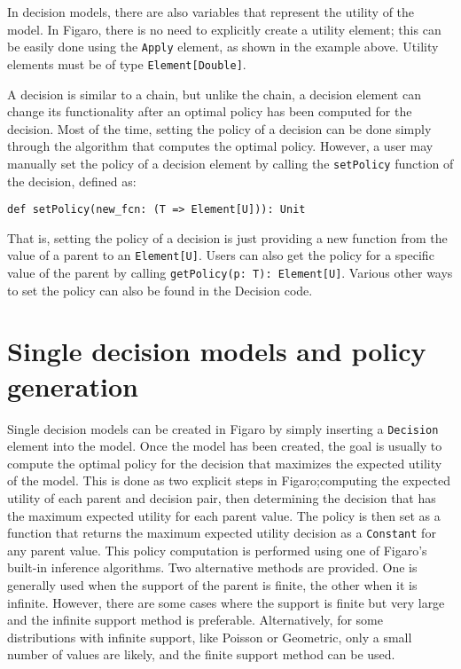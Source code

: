 In decision models, there are also variables that represent the utility of the model. In Figaro, there is no need to explicitly create a utility element; this can be easily done using the \texttt{Apply} element, as shown in the example above. Utility elements must be of type \texttt{Element[Double]}.

A decision is similar to a chain, but unlike the chain, a decision element can change its functionality after an optimal policy has been computed for the decision. Most of the time, setting the policy of a decision can be done simply through the algorithm that computes the optimal policy. However, a user may manually set the policy of a decision element by calling the \texttt{setPolicy} function of the decision, defined as:

\begin{flushleft}
\texttt{def setPolicy(new\_fcn: (T => Element[U])): Unit}
\end{flushleft}

That is, setting the policy of a decision is just providing a new function from the value of a parent to an \texttt{Element[U]}. Users can also get the policy for a specific value of the parent by calling \texttt{getPolicy(p: T): Element[U]}. Various other ways to set the policy can also be found in the Decision code.

\section{Single decision models and policy generation}

Single decision models can be created in Figaro by simply inserting a \texttt{Decision} element into the model. Once the model has been created, the goal is usually to compute the optimal policy for the decision that maximizes the expected utility of the model. This is done as two explicit steps in Figaro;computing the expected utility of each parent and decision pair, then determining the decision that has the maximum expected utility for each parent value. The policy is then set as a function that returns the maximum expected utility decision as a \texttt{Constant}  for any parent value. This policy computation is performed using one of Figaro's built-in inference algorithms. Two alternative methods are provided. One is generally used when the support of the parent is finite, the other when it is infinite. However, there are some cases where the support is finite but very large and the infinite support method is preferable. Alternatively, for some distributions with infinite support, like Poisson or Geometric, only a small number of values are likely, and the finite support method can be used.

